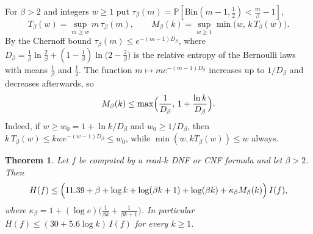 \documentclass[11pt]{amsart}
\newtheorem{theorem}{Theorem}[section]
\theoremstyle{definition}
\theoremstyle{remark}
\renewcommand{\Pr}{\mathbb{P}}
\newcommand{\Bin}{\mathrm{Bin}}
\begin{document}
For $\beta>2$ and integers $w\ge1$ put $\tau_\beta(m)=\Pr[\Bin(m-1,\frac12)<\frac m\beta-1]$,
\[
T_\beta(w)=\sup_{m\ge w}m\,\tau_\beta(m),\qquad M_\beta(k)=\sup_{w\ge1}\min\bigl(w,\,k\,T_\beta(w)\bigr).
\]
By the Chernoff bound $\tau_\beta(m)\le e^{-(m-1)D_\beta}$, where $D_\beta=\frac1\beta\ln\frac2\beta+
(1-\frac1\beta)\ln\bigl(2-\frac2\beta\bigr)$ is the relative entropy of the Bernoulli laws with means $\frac1\beta$ and
$\frac12$. The function $m\mapsto me^{-(m-1)D_\beta}$ increases up to $1/D_\beta$ and decreases afterwards, so
\begin{equation}\label{eq:Mbound}
M_\beta(k)\le\max\Bigl(\frac1{D_\beta},\,1+\frac{\ln k}{D_\beta}\Bigr).
\end{equation}
Indeed, if $w\ge w_0=1+\ln k/D_\beta$ and $w_0\ge1/D_\beta$, then $k\,T_\beta(w)\le kwe^{-(w-1)D_\beta}\le w_0$, while
$\min(w,kT_\beta(w))\le w$ always.

\begin{theorem}\label{thm:readk-log}
Let $f$ be computed by a read-$k$ DNF or CNF formula and let $\beta>2$. Then
\[
H(f)\le\Bigl(11.39+\beta+\log k+\log(\beta k+1)+\log(\beta k)+\kappa_\beta M_\beta(k)\Bigr)\,I(f),
\]
where $\kappa_\beta=1+(\log e)\bigl(\frac1{\beta k}+\frac1{\beta k+1}\bigr)$. In particular
$H(f)\le(30+5.6\log k)\,I(f)$ for every $k\ge1$.
\end{theorem}
\end{document}
